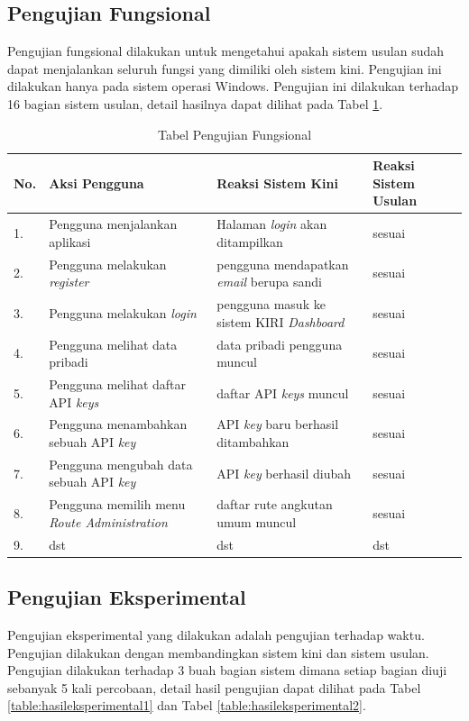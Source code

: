 \subsection{Pengujian Fungsional}
\label{sec:pengujianfungsional}
Pengujian fungsional dilakukan untuk mengetahui apakah sistem usulan sudah dapat menjalankan seluruh fungsi yang dimiliki oleh sistem kini. Pengujian ini dilakukan hanya pada sistem operasi Windows. Pengujian ini dilakukan terhadap 16 bagian sistem usulan, detail hasilnya dapat dilihat pada Tabel \ref{table:hasilfungsional}.

\begin{table}[H]
	\centering
	\caption{Tabel Pengujian Fungsional}
		\begin{tabular}{|p{0.25cm}| p{3.5cm}| p{7cm}| p{2.5cm}|} \hline
		No. & Aksi Pengguna	& Reaksi Sistem Kini & Reaksi Sistem Usulan \\ \hline
		1. & Pengguna menjalankan aplikasi & Halaman \textit{login} akan ditampilkan & sesuai \\ \hline
		2. & Pengguna melakukan \textit{register} & pengguna mendapatkan \textit{email} berupa sandi & sesuai \\ \hline
		3. & Pengguna melakukan \textit{login} & pengguna masuk ke sistem KIRI \textit{Dashboard} & sesuai	\\ \hline
		4. & Pengguna melihat data pribadi & data pribadi pengguna muncul & sesuai \\ \hline
		5. & Pengguna melihat daftar API \textit{keys} & daftar API \textit{keys} muncul & sesuai \\ \hline
		6. & Pengguna menambahkan sebuah API \textit{key} & API \textit{key} baru berhasil ditambahkan & sesuai \\ \hline
		7. & Pengguna mengubah data sebuah API \textit{key} & API \textit{key} berhasil diubah & sesuai \\ \hline
		8. & Pengguna memilih menu \textit{Route Administration} & daftar rute angkutan umum muncul & sesuai \\ \hline
		9. & dst & dst & dst \\ \hline
		\end{tabular}
	\label{table:hasilfungsional}
\end{table}

\subsection{Pengujian Eksperimental}
\label{sec:pengujianeksperimental}
Pengujian eksperimental yang dilakukan adalah pengujian terhadap waktu. Pengujian dilakukan dengan membandingkan sistem kini dan sistem usulan. Pengujian dilakukan terhadap 3 buah bagian sistem dimana setiap bagian diuji sebanyak 5 kali percobaan, detail hasil pengujian dapat dilihat pada Tabel \ref{table:hasileksperimental1} dan Tabel \ref{table:hasileksperimental2}.


